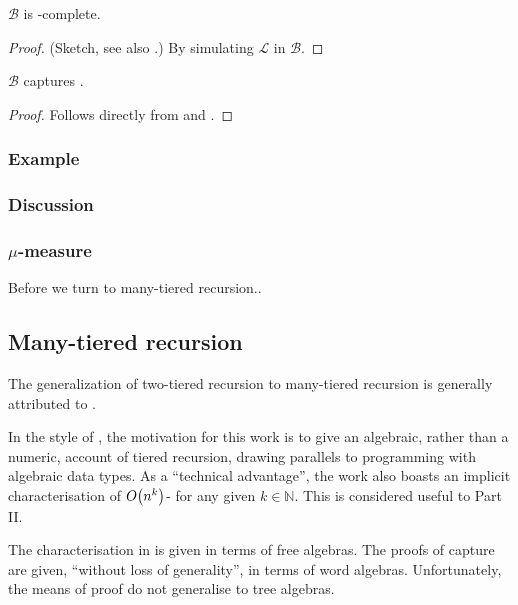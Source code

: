 \begin{lemma} \label{lem:b-fptime-complete} $\mathcal{B}$ is
\FPTIME{}-complete.  \end{lemma}

\begin{proof} (Sketch, see also \cite{bellantoni-cook-1992}.) By simulating
$\mathcal{L}$ in $\mathcal{B}$.  \end{proof}

\begin{theorem} $\mathcal{B}$ captures \FPTIME{}. \end{theorem}

\begin{proof} Follows directly from  and
. \end{proof}

\subsubsection{Example}

\subsubsection{Discussion}

\subsubsection{$\mu$-measure}

Before we turn to many-tiered recursion..

\subsection{Many-tiered recursion}

The generalization of two-tiered recursion to many-tiered recursion is
generally attributed to \cite{leivant-1995}.

In the style of \cite{leivant-1990}, the motivation for this work is to give an
algebraic, rather than a numeric, account of tiered recursion, drawing
parallels to programming with algebraic data types. As a ``technical
advantage'', the work also boasts an implicit characterisation of
$O{\mathopen{}\left({n^k}\right)\mathclose{}}$-\TIME{} for any given $k\in \mathbb{N}$. This is considered useful
to Part II.

The characterisation in \cite{leivant-1995} is given in terms of free algebras.
The proofs of capture are given, ``without loss of generality'', in terms of
word algebras. Unfortunately, the means of proof do not generalise to tree
algebras\cite{caseiro-1996, dal-lago-et-al-2010}.

